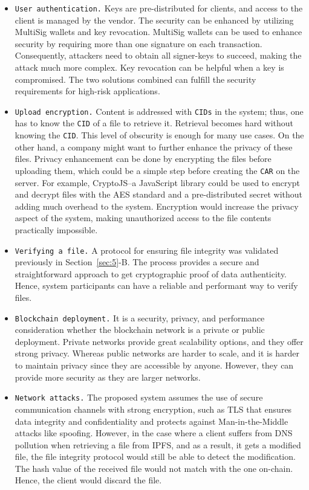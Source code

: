 \documentclass[conference]{IEEEtran}
\begin{document}
\begin{itemize}
    \item \texttt{User authentication.} Keys are pre-distributed for clients, and access to the client is managed by the vendor. The security can be enhanced by utilizing MultiSig wallets and key revocation. MultiSig wallets can be used to enhance security by requiring more than one signature on each transaction. Consequently, attackers need to obtain all signer-keys to succeed, making the attack much more complex. Key revocation can be helpful when a key is compromised. The two solutions combined can fulfill the security requirements for high-risk applications.
    \item \texttt{Upload encryption.} Content is addressed with \texttt{CIDs} in the system; thus, one has to know the \texttt{CID} of a file to retrieve it. Retrieval becomes hard without knowing the \texttt{CID}. This level of obscurity is enough for many use cases. On the other hand, a company might want to further enhance the privacy of these files. Privacy enhancement can be done by encrypting the files before uploading them, which could be a simple step before creating the \texttt{CAR} on the server. For example, CryptoJS--a JavaScript library  could be used to encrypt and decrypt files with the AES standard and a pre-distributed secret without adding much overhead to the system. Encryption would increase the privacy aspect of the system, making unauthorized access to the file contents practically impossible.
        
    \item \texttt{Verifying a file.} A protocol for ensuring file integrity was validated previously in Section~\ref{sec:5}-B. The process provides a secure and straightforward approach to get cryptographic proof of data authenticity. Hence, system participants can have a reliable and performant way to verify files.
        
    \item \texttt{Blockchain deployment.} It is a security, privacy, and performance consideration whether the blockchain network is a private or public deployment. Private networks provide great scalability options, and they offer strong privacy. Whereas public networks are harder to scale, and it is harder to maintain privacy since they are accessible by anyone. However, they can provide more security as they are larger networks.
        
    \item \texttt{Network attacks.} The proposed system assumes the use of secure communication channels with strong encryption, such as TLS that ensures data integrity and confidentiality and protects against Man-in-the-Middle attacks like spoofing. However, in the case where a client suffers from DNS pollution when retrieving a file from IPFS, and as a result, it gets a modified file, the file integrity protocol would still be able to detect the modification. The hash value of the received file would not match with the one on-chain. Hence, the client would discard the file.
\end{itemize}
\end{document}
